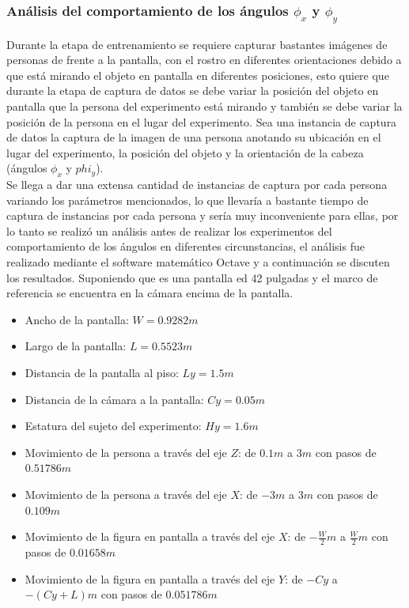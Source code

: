    \subsubsection{Análisis del comportamiento de los ángulos $\phi_x$ y $\phi_y$} 
   Durante la etapa de entrenamiento se requiere capturar bastantes imágenes de personas de frente a la pantalla, con el rostro en diferentes orientaciones debido a que está mirando el objeto en pantalla en diferentes posiciones, esto quiere que durante la etapa de captura de datos se debe variar la posición del objeto en pantalla que la persona del experimento está mirando y también se debe variar la posición de la persona en el lugar del experimento. Sea una instancia de captura de datos la captura de la imagen de una persona anotando su ubicación en el lugar del experimento, la posición del objeto y la orientación de la cabeza (ángulos $\phi_x$ y $phi_y$).
   \\Se llega a dar una extensa cantidad de instancias de captura por cada persona variando los parámetros mencionados, lo que llevaría a bastante tiempo de captura de instancias por cada persona y sería muy inconveniente para ellas, por lo tanto se realizó un análisis antes de realizar los experimentos del comportamiento de los ángulos en diferentes circunstancias, el análisis fue realizado mediante el software matemático Octave y a continuación se discuten los resultados.
   Suponiendo que es una pantalla ed 42 pulgadas y el marco de referencia se encuentra en la cámara encima de la pantalla.
   \begin{itemize}
   	\item Ancho de la pantalla: $W=0.9282m$
   	\item Largo de la pantalla: $L=0.5523m$
   	\item Distancia de la pantalla al piso: $Ly=1.5m$
   	\item Distancia de la cámara a la pantalla: $Cy=0.05m$
   	\item Estatura del sujeto del experimento: $Hy=1.6m$
   	\item Movimiento de la persona a través del eje $Z$: de $0.1m$ a $3m$ con pasos de $0.51786m$
   	\item Movimiento de la persona a través del eje $X$: de $-3m$ a $3m$ con pasos de $0.109m$
   	\item Movimiento de la figura en pantalla a través del eje $X$: de $-\frac{W}{2}m$ a $\frac{W}{2}m$ con pasos de $0.01658m$
   	\item Movimiento de la figura en pantalla a través del eje $Y$: de $-Cy$ a $-(Cy+L)m$ con pasos de $0.051786m$
   \end{itemize}
   
